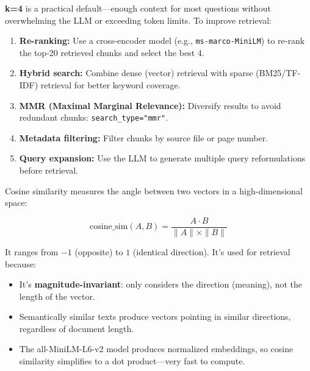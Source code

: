 \documentclass[12pt,a4paper]{article}
\begin{document}
\begin{interviewbox}[Q11: Why top-k=4 for retrieval? How would you improve retrieval quality?]
\end{interviewbox}
\begin{answerbox}
\textbf{k=4} is a practical default—enough context for most questions without overwhelming the LLM or exceeding token limits. To improve retrieval:
\begin{enumerate}
  \item \textbf{Re-ranking:} Use a cross-encoder model (e.g., \texttt{ms-marco-MiniLM}) to re-rank the top-20 retrieved chunks and select the best 4.
  \item \textbf{Hybrid search:} Combine dense (vector) retrieval with sparse (BM25/TF-IDF) retrieval for better keyword coverage.
  \item \textbf{MMR (Maximal Marginal Relevance):} Diversify results to avoid redundant chunks: \texttt{search\_type="mmr"}.
  \item \textbf{Metadata filtering:} Filter chunks by source file or page number.
  \item \textbf{Query expansion:} Use the LLM to generate multiple query reformulations before retrieval.
\end{enumerate}
\end{answerbox}

\begin{interviewbox}
\end{interviewbox}
\begin{answerbox}
Cosine similarity measures the angle between two vectors in a high-dimensional space:

$$\text{cosine\_sim}(A, B) = \frac{A \cdot B}{\|A\| \times \|B\|}$$

It ranges from $-1$ (opposite) to $1$ (identical direction). It's used for retrieval because:
\begin{itemize}
  \item It's \textbf{magnitude-invariant}: only considers the direction (meaning), not the length of the vector.
  \item Semantically similar texts produce vectors pointing in similar directions, regardless of document length.
  \item The all-MiniLM-L6-v2 model produces normalized embeddings, so cosine similarity simplifies to a dot product—very fast to compute.
\end{itemize}
\end{answerbox}
\end{document}
